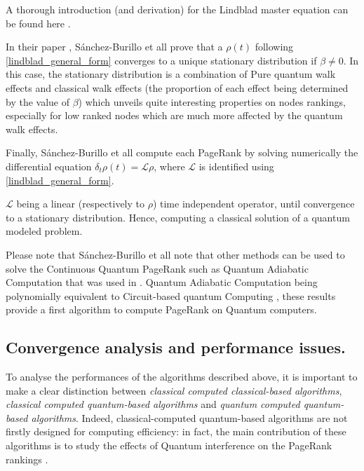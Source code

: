 \documentclass[sn-mathphys]{sn-jnl}%
\theoremstyle{thmstyleone}%
\theoremstyle{thmstyletwo}%
\theoremstyle{thmstylethree}%
\begin{document}
A thorough introduction (and derivation) for the Lindblad master
equation can be found here \cite{manzano_2020}.

In their paper \cite{sanchez-burillo_duch_gomez-gardenes_zueco_2012},
Sánchez-Burillo et all prove that a $\rho(t)$ following
\eqref{lindblad_general_form} converges to a unique stationary
distribution if $\beta \neq 0$. In this case, the stationary
distribution is a combination of Pure quantum walk effects and
classical walk effects (the proportion of each effect being determined
by the value of $\beta$) which unveils quite interesting properties on
nodes rankings, especially for low ranked nodes which are much more
affected by the quantum walk effects.

Finally, Sánchez-Burillo et all compute each PageRank by solving
numerically the differential equation
$\delta_t \rho(t) = \mathcal{L}\rho$, where $\mathcal{L}$ is
identified using \eqref{lindblad_general_form}.

$\mathcal{L}$ being a linear (respectively to $\rho$) time independent operator, until convergence to a stationary distribution. Hence, computing a classical solution of a quantum modeled problem.

Please note that Sánchez-Burillo et all note that other methods can be used to solve the Continuous Quantum PageRank such as Quantum Adiabatic Computation that was used in \cite{garnerone_zanardi_lidar_2012}. Quantum Adiabatic Computation being polynomially equivalent to Circuit-based quantum Computing \cite{aharonov_dam_kempe_landau_lloyd_regev_2008}, these results provide a first algorithm to compute PageRank on Quantum computers.

\subsection{Convergence analysis and performance issues.}
\label{subsec:performanceIssues}

To analyse the performances of the algorithms described above, it is
important to make a clear distinction between \textit{classical
  computed classical-based algorithms}, \textit{classical computed
  quantum-based algorithms} and \textit{quantum computed quantum-based
  algorithms}. Indeed, classical-computed quantum-based algorithms are
not firstly designed for computing efficiency: in fact, the main
contribution of these algorithms is to study the effects of Quantum
interference on the PageRank rankings
\cite{paparo_muller_comellas_martin-delgado_2013,
  sanchez-burillo_duch_gomez-gardenes_zueco_2012}.
\end{document}
